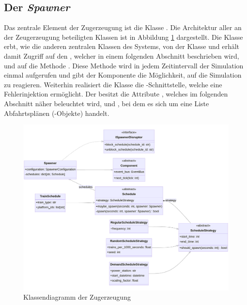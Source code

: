 \subsection{Der \emph{Spawner}}

Das zentrale Element der Zugerzeugung ist die Klasse . Die Architektur aller an der Zeugerzeugung beteiligten Klassen ist in Abbildung \ref{fig:spawner-class} dargestellt. Die Klasse  erbt, wie die anderen zentralen Klassen des Systems, von der Klasse  und erhält damit Zugriff auf den , welcher in einem folgenden Abschnitt beschrieben wird, und auf die Methode . Diese Methode wird in jedem Zeitintervall der Simulation einmal aufgerufen und gibt der Komponente die Möglichkeit, auf die Simulation zu reagieren. Weiterhin realisiert die Klasse  die -Schnittstelle, welche eine Fehlerinjektion\cite{persitzky_fehlerinjektion_2023} ermöglicht. Der  besitzt die Attribute , welches im folgenden Abschnitt näher beleuchtet wird, und , bei dem es sich um eine Liste Abfahrtsplänen (-Objekte) handelt.

\begin{figure}[H]
	\centering
	\includegraphics[width=1.0\linewidth]{images/diagrams/spawner-class.png}
	\caption{Klassendiagramm der Zugerzeugung}
	\label{fig:spawner-class}
\end{figure}

